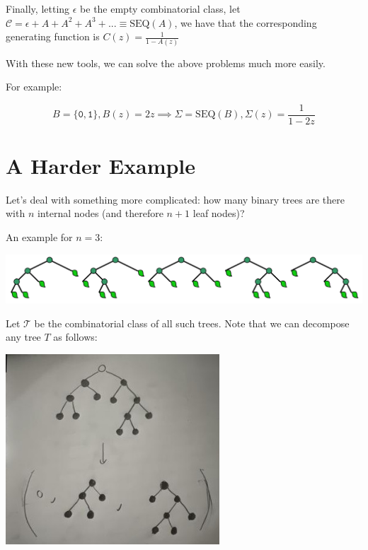 \documentclass[aspectratio=169]{beamer}
\begin{document}
\begin{frame}
    Finally, letting $\epsilon$ be the empty combinatorial class, let $\mathcal{C} = \epsilon + A + A^2 + A^3 + ... \equiv \text{SEQ}(A) $, we have that the corresponding generating function is $C(z) = \frac{1}{1-A(z)}$
\end{frame}

\begin{frame}

With these new tools, we can solve the above problems much more easily.

\vspace{25pt}

For example:

$$ B = \{ \texttt{0}, \texttt{1} \}, B(z) = 2z \implies \Sigma = \text{SEQ}(B), \Sigma(z) = \frac{1}{1-2z} $$

\end{frame}

\section*{A Harder Example}

\begin{frame}

Let's deal with something more complicated: how many binary trees are there with $n$ internal nodes (and therefore $n+1$ leaf nodes)?

An example for $ n = 3 $:

\includegraphics[width=\textwidth]{trees.png}

\end{frame}
Let $\mathcal{T}$ be the combinatorial class of all such trees. Note that we can decompose any tree $T$ as follows:

\begin{center}
\includegraphics[width=0.6\textwidth]{tree_decomp.jpg}
\end{center}
\end{document}
